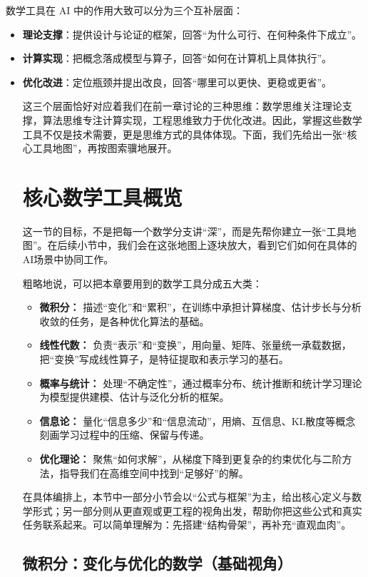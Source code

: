 数学工具在 AI 中的作用大致可以分为三个互补层面：
\begin{itemize}
\item \textbf{理论支撑}：提供设计与论证的框架，回答“为什么可行、在何种条件下成立”。 
\item \textbf{计算实现}：把概念落成模型与算子，回答“如何在计算机上具体执行”。 
\item \textbf{优化改进}：定位瓶颈并提出改良，回答“哪里可以更快、更稳或更省”。

这三个层面恰好对应着我们在前一章讨论的三种思维：数学思维关注理论支撑，算法思维专注计算实现，工程思维致力于优化改进。因此，掌握这些数学工具不仅是技术需要，更是思维方式的具体体现。下面，我们先给出一张“核心工具地图”，再按图索骥地展开。

\section{核心数学工具概览}

这一节的目标，不是把每一个数学分支讲“深”，而是先帮你建立一张“工具地图”。在后续小节中，我们会在这张地图上逐块放大，看到它们如何在具体的AI场景中协同工作。

粗略地说，可以把本章要用到的数学工具分成五大类：
\begin{itemize}
  \item \textbf{微积分：} 描述“变化”和“累积”，在训练中承担计算梯度、估计步长与分析收敛的任务，是各种优化算法的基础。
  \item \textbf{线性代数：} 负责“表示”和“变换”，用向量、矩阵、张量统一承载数据，把“变换”写成线性算子，是特征提取和表示学习的基石。
  \item \textbf{概率与统计：} 处理“不确定性”，通过概率分布、统计推断和统计学习理论为模型提供建模、估计与泛化分析的框架。
 \item \textbf{信息论：} 量化“信息多少”和“信息流动”，用熵、互信息、KL散度等概念刻画学习过程中的压缩、保留与传递。
  \item \textbf{优化理论：} 聚焦“如何求解”，从梯度下降到更复杂的约束优化与二阶方法，指导我们在高维空间中找到“足够好”的解。
\end{itemize}
 
 在具体编排上，本节中一部分小节会以“公式与框架”为主，给出核心定义与数学形式；另一部分则从更直观或更工程的视角出发，帮助你把这些公式和真实任务联系起来。可以简单理解为：先搭建“结构骨架”，再补充“直观血肉”。

\subsection{微积分：变化与优化的数学（基础视角）}


\end{itemize}

